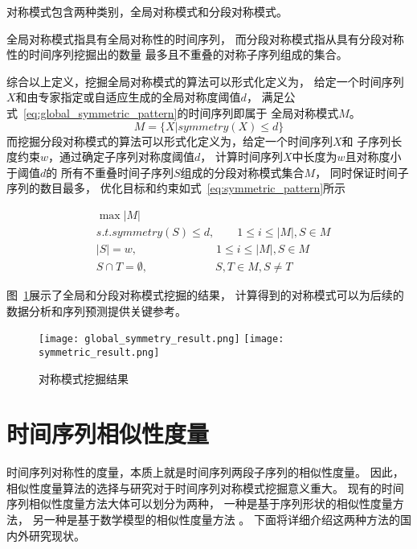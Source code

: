 \begin{definition}
  对称模式包含两种类别，全局对称模式和分段对称模式。

  全局对称模式指具有全局对称性的时间序列，
  而分段对称模式指从具有分段对称性的时间序列挖掘出的数量
  最多且不重叠的对称子序列组成的集合\cite{2022968}。 
  
\end{definition}

综合以上定义，挖掘全局对称模式的算法可以形式化定义为，
给定一个时间序列$X$和由专家指定或自适应生成的全局对称度阈值$d$，
满足公式~\ref{eq:global_symmetric_pattern}的时间序列即属于
全局对称模式$M$。
\begin{equation}
  M = \{X | symmetry(X) \leq d\}
  \label{eq:global_symmetric_pattern}
\end{equation}
而挖掘分段对称模式的算法可以形式化定义为，给定一个时间序列$X$和
子序列长度约束$w$，通过确定子序列对称度阈值$d$，
计算时间序列$X$中长度为$w$且对称度小于阈值$d$的
所有不重叠时间子序列$S$组成的分段对称模式集合$M$，
同时保证时间子序列的数目最多，
优化目标和约束如式~\ref{eq:symmetric_pattern}所示

\begin{equation}
  \begin{split}
    & \max \left| M \right| \\
    & s.t. symmetry \left( S \right) \leq d, \qquad 1 \leq i \leq \left| M \right|,S \in M \\
    & \left| S \right| = w, \qquad \qquad \qquad \quad 1 \leq i \leq \left| M \right|,S \in M \\
    & S \cap T = \emptyset, \qquad \qquad \qquad S,T \in M,S \neq T
  \end{split}
  \label{eq:symmetric_pattern}
\end{equation}

图~\ref{fig:symmetric_result}展示了全局和分段对称模式挖掘的结果，
计算得到的对称模式可以为后续的数据分析和序列预测提供关键参考。
\begin{figure}
  \centering
    {\texttt{[image: global\_symmetry\_result.png]}}
    {\texttt{[image: symmetric\_result.png]}}
  \caption{对称模式挖掘结果}
  \label{fig:symmetric_result}
\end{figure}

\section{时间序列相似性度量}
时间序列对称性的度量，本质上就是时间序列两段子序列的相似性度量。
因此，相似性度量算法的选择与研究对于时间序列对称模式挖掘意义重大。
现有的时间序列相似性度量方法大体可以划分为两种，
一种是基于序列形状的相似性度量方法，
另一种是基于数学模型的相似性度量方法
\cite{DBLP:journals/vldb/SuLZZZ20}。
下面将详细介绍这两种方法的国内外研究现状。

